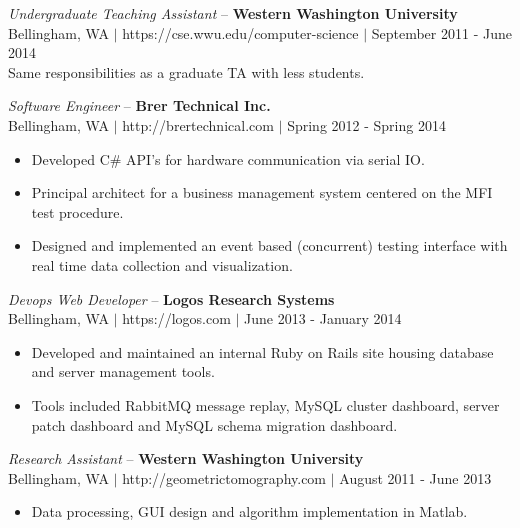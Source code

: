 \documentclass[line,margin]{res}
\begin{document}
\begin{resume}
	{\sl Undergraduate Teaching Assistant} -- {\bf Western Washington University} \\
	{\footnotesize Bellingham, WA $|$ https://cse.wwu.edu/computer-science $|$ September 2011 - June 2014} \\
	Same responsibilities as a graduate TA with less students. 
	
	{\sl Software Engineer} -- {\bf Brer Technical Inc.} \\
	{\footnotesize Bellingham, WA $|$ http://brertechnical.com $|$ Spring 2012 - Spring 2014}
	\begin{itemize} \itemsep -2pt
		\item Developed C\# API's for hardware communication via serial IO.
		\item Principal architect for a business management system centered on the MFI test procedure.
		\item Designed and implemented an event based (concurrent) testing interface with real time data collection and visualization.
	\end{itemize}
 
	{\sl Devops Web Developer} -- {\bf Logos Research Systems} \\
	{\footnotesize Bellingham, WA $|$ https://logos.com $|$ June 2013 - January 2014}
	\begin{itemize} \itemsep -2pt
		\item Developed and maintained an internal Ruby on Rails site housing database and server management tools.
		\item Tools included RabbitMQ message replay, MySQL cluster dashboard, server patch dashboard and MySQL schema migration dashboard.
	\end{itemize}

	{\sl Research Assistant} -- {\bf Western Washington University} \\
	{\footnotesize Bellingham, WA $|$ http://geometrictomography.com $|$ August 2011 - June 2013}
	\begin{itemize}  \itemsep -2pt
		\item Data processing, GUI design and algorithm implementation in Matlab.
	\end{itemize} 



\end{resume}
\end{document}
